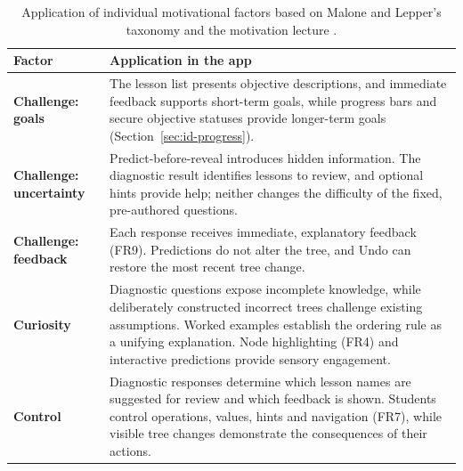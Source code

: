 \begin{table}[htbp]
\centering
\caption{Application of individual motivational factors based on Malone and Lepper’s taxonomy and the motivation lecture \cite{Malone1987,Marshall2026Motivation}.}
\label{tab:malone-lepper}
\small
\renewcommand{\arraystretch}{1.1}
\begin{tabularx}{\textwidth}{@{}p{2.5cm}X@{}}
\toprule
\textbf{Factor} & \textbf{Application in the app} \\
\midrule

\textbf{Challenge: goals} &
The lesson list presents objective descriptions, and immediate feedback supports short-term goals, while progress bars and secure objective statuses provide longer-term goals (Section~\ref{sec:id-progress}). \\

\addlinespace[3pt]
\textbf{Challenge: uncertainty} &
Predict-before-reveal introduces hidden information. The diagnostic result identifies lessons to review, and optional hints provide help; neither changes the difficulty of the fixed, pre-authored questions. \\

\addlinespace[3pt]
\textbf{Challenge: feedback} &
Each response receives immediate, explanatory feedback (FR9). Predictions do not alter the tree, and Undo can restore the most recent tree change. \\

\addlinespace[3pt]
\textbf{Curiosity} &
Diagnostic questions expose incomplete knowledge, while deliberately constructed incorrect trees challenge existing assumptions. Worked examples establish the ordering rule as a unifying explanation. Node highlighting (FR4) and interactive predictions provide sensory engagement. \\

\addlinespace[3pt]
\textbf{Control} &
Diagnostic responses determine which lesson names are suggested for review and which feedback is shown. Students control operations, values, hints and navigation (FR7), while visible tree changes demonstrate the consequences of their actions. \\

\bottomrule
\end{tabularx}
\end{table}

